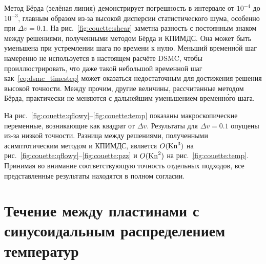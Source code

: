 Метод Бёрда (зелёная линия) демонстрирует погрешность в интервале от \(10^{-4}\) до \(10^{-3}\),
главным образом из-за высокой дисперсии статистического шума, особенно при \(\Delta{v}=0.1\).
На рис.~\ref{fig:couette:shear} заметна разность с постоянным знаком между решениями,
полученными методом Бёрда и КПИМДС.
Она может быть уменьшена при устремлении шага по времени к нулю.
Меньший временн\'{о}й шаг намеренно не используется в настоящем расчёте DSMC,
чтобы проиллюстрировать, что даже такой небольшой временной шаг как~\eqref{eq:dsmc_timestep}
может оказаться недостаточным для достижения решения высокой точности.
Между прочим, другие величины, рассчитанные методом Бёрда, практически не меняются
с дальнейшим уменьшением временн\'{о}го шага.

На рис.~\ref{fig:couette:qflowy}--\ref{fig:couette:temp} показаны макроскопические переменные,
возникающие как квадрат от \(\Delta{v}\).
Результаты для \(\Delta{v}=0.1\) опущены из-за низкой точности.
Разница между решениями, полученными асимптотическим методом и КПИМДС,
является \(O(\mathrm{Kn}^3)\) на рис.~\ref{fig:couette:qflowy}--\ref{fig:couette:pzz}
и \(O(\mathrm{Kn}^2)\) на рис.~\ref{fig:couette:temp}.
Принимая во внимание соответствующую точность отдельных подходов,
все представленные результаты находятся в полном согласии.

\section{Течение между пластинами с синусоидальным распределением температур} \label{sect:sone_bobylev}

